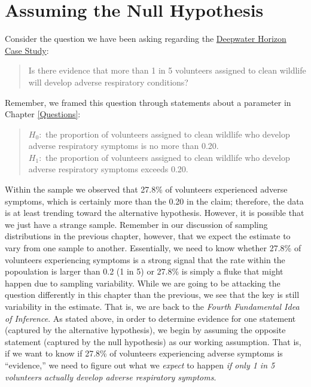 \documentclass[]{book}
\theoremstyle{definition}
\theoremstyle{definition}
\theoremstyle{remark}
\begin{document}
\section{Assuming the Null
Hypothesis}\label{assuming-the-null-hypothesis}

Consider the question we have been asking regarding the
\protect\hyperlink{CaseDeepwater}{Deepwater Horizon Case Study}:

\begin{quote}
Is there evidence that more than 1 in 5 volunteers assigned to clean
wildlife will develop adverse respiratory conditions?
\end{quote}

Remember, we framed this question through statements about a parameter
in Chapter \ref{Questions}:

\begin{quote}
\(H_0:\) the proportion of volunteers assigned to clean wildlife who
develop adverse respiratory symptoms is no more than 0.20.\\
\(H_1:\) the proportion of volunteers assigned to clean wildlife who
develop adverse respiratory symptoms exceeds 0.20.
\end{quote}

Within the sample we observed that 27.8\% of volunteers experienced
adverse symptoms, which is certainly more than the 0.20 in the claim;
therefore, the data is at least trending toward the alternative
hypothesis. However, it is possible that we just have a strange sample.
Remember in our discussion of sampling distributions in the previous
chapter, however, that we expect the estimate to vary from one sample to
another. Essentially, we need to know whether 27.8\% of volunteers
experiencing symptoms is a strong signal that the rate within the
popoulation is larger than 0.2 (1 in 5) or 27.8\% is simply a fluke that
might happen due to sampling variability. While we are going to be
attacking the question differently in this chapter than the previous, we
see that the key is still variability in the estimate. That is, we are
back to the \emph{Fourth Fundamental Idea of Inference}. As stated
above, in order to determine evidence for one statement (captured by the
alternative hypothesis), we begin by assuming the opposite statement
(captured by the null hypothesis) as our working assumption. That is, if
we want to know if 27.8\% of volunteers experiencing adverse symptoms is
``evidence,'' we need to figure out what we \emph{expect} to happen
\emph{if only 1 in 5 volunteers actually develop adverse respiratory
symptoms}.
\end{document}
